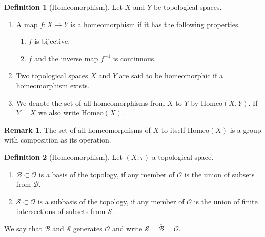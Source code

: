 \documentclass[a4paper]{book}
\theoremstyle{definition}
\newtheorem{definition}{Definition}[chapter]
\newtheorem*{remark}{Remark}
\begin{document}
\begin{defbox}
    \begin{definition}[Homeomorphism]
        Let \(X\) and \(Y\) be {\color{mathif}topological spaces}.
        \begin{enumerate}
            \item A {\color{mathobj}map} \(f: X \longrightarrow Y\) is a {\color{maththen}homeomorphism} if it has the following properties.

            \begin{enumerate}
                \item \(f\) is {\color{mathif}bijective}.
                \item \(f\) and the {\color{mathif}inverse map} \(f^{-1}\) is {\color{mathif}continuous}.
            \end{enumerate}

            \item Two topological spaces \(X\) and \(Y\) are said to be {\color{maththen}homeomorphic} if a homeomorphism exists.

            \item We denote the set of all homeomorphisms from \(X\) to \(Y\) by \(\mathrm{Homeo}(X, Y)\). If \(Y = X\) we also write \(\mathrm{Homeo}(X)\).
        \end{enumerate}
    \end{definition}
\end{defbox}
\begin{remark}
    The set of all homeomorphisms of \(X\) to itself \(\mathrm{Homeo}(X)\) is a group with composition as its operation.
\end{remark}

\begin{defbox}
    \begin{definition}[Homeomorphism]
        Let \((X, \tau)\) a {\color{mathif}topological space}.
        \begin{enumerate}
            \item \(\mathcal{B} \subset \mathcal{O}\) is a {\color{maththen}basis} of the topology, if any member of \(\mathcal{O}\) is the {\color{mathif}union of subsets} from \(\mathcal{B}\).
            \item \(\mathcal{S} \subset \mathcal{O}\) is a {\color{maththen}subbasis} of the topology, if any member of \(\mathcal{O}\) is the {\color{mathif}union of finite intersections of subsets} from \(\mathcal{S}\).
        \end{enumerate}
        We say that \(\mathcal{B}\) and \(\mathcal{S}\) {\color{maththen}generates} \(\mathcal{O}\) and write \(\overline{\mathcal{S}} = \overline{\mathcal{B}} = \mathcal{O}\).
    \end{definition}
\end{defbox}
\end{document}

